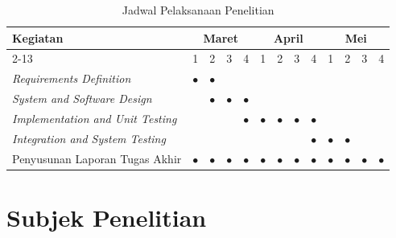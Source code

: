 \begin{table}[H]
	\centering
	\caption{Jadwal Pelaksanaan Penelitian}
	\label{tab:jadwal}
	\small
	\begin{tabular}{|l|c|c|c|c|c|c|c|c|c|c|c|c|}
		\hline
		\multirow{2}{*}{\textbf{Kegiatan}}       & \multicolumn{4}{c|}{\textbf{Maret}} & \multicolumn{4}{c|}{\textbf{April}} & \multicolumn{4}{c|}{\textbf{Mei}}                                                                                                             \\
		\cline{2-13}
		                                         & 1                                   & 2                                   & 3                                 & 4         & 1         & 2         & 3         & 4         & 1         & 2         & 3         & 4         \\
		\hline
		\textit{Requirements Definition}         & $\bullet$                           & $\bullet$                           &                                   &           &           &           &           &           &           &           &           &           \\
		\hline
		\textit{System and Software Design}      &                                     & $\bullet$                           & $\bullet$                         & $\bullet$ &           &           &           &           &           &           &           &           \\
		\hline
		\textit{Implementation and Unit Testing} &                                     &                                     &                                   & $\bullet$ & $\bullet$ & $\bullet$ & $\bullet$ & $\bullet$ &           &           &           &           \\
		\hline
		\textit{Integration and System Testing}  &                                     &                                     &                                   &           &           &           &           & $\bullet$ & $\bullet$ & $\bullet$ &           &           \\
		\hline
		Penyusunan Laporan Tugas Akhir           & $\bullet$                           & $\bullet$                           & $\bullet$                         & $\bullet$ & $\bullet$ & $\bullet$ & $\bullet$ & $\bullet$ & $\bullet$ & $\bullet$ & $\bullet$ & $\bullet$ \\
		\hline
	\end{tabular}
\end{table}

\section{Subjek Penelitian}

